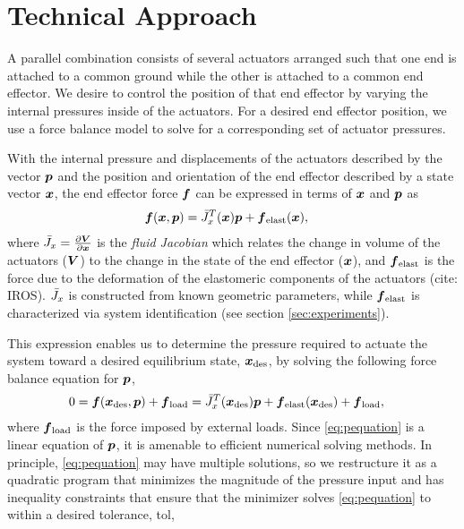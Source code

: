 \section{Technical Approach}    \label{sec:technical-approach}

A parallel combination consists of several actuators arranged such that one end is attached to a common ground while the other is attached to a common end effector. We desire to control the position of that end effector by varying the internal pressures inside of the actuators. For a desired end effector position, we use a force balance model to solve for a corresponding set of actuator pressures.

With the internal pressure and displacements of the actuators described by the vector $\p$ and the position and orientation of the end effector described by a state vector $\x$, the end effector force $\f$ can be expressed in terms of $\x$ and $\p$ as 
\begin{align}
    \f (\x, \p) &= \J_x^T (\x) \p + \f_{\tx{elast}} ( \x ),
\end{align}
where $\J_x = \frac{\partial \vec{V}}{\partial \x}$ is the \emph{fluid Jacobian} which relates the change in volume of the actuators ($\V$) to the change in the state of the end effector ($\x$), and $\f_\tx{elast}$ is the force due to the deformation of the elastomeric components of the actuators (cite: IROS). $\bar{J}_x$ is constructed from known geometric parameters, while $\f_\tx{elast}$ is characterized via system identification (see section \ref{sec:experiments}).

This expression enables us to determine the pressure required to actuate the system toward a desired equilibrium state, $\x_\tx{des}$, by solving the following force balance equation for $\p$,
\begin{align}
    0 &= \f (\x_{\tx{des}}, \p) + \f_\tx{load} =  \J_x^T (\x_\tx{des}) \p + \f_{\tx{elast}} (\x_\tx{des}) + \f_\tx{load} , 
    \label{eq:pequation}
\end{align}
where $\f_\tx{load}$ is the force imposed by external loads.
Since \eqref{eq:pequation} is a linear equation of $\p$, it is amenable to efficient numerical solving methods. In principle, \eqref{eq:pequation} may have multiple solutions, so we restructure it as a quadratic program that minimizes the magnitude of the pressure input and has inequality constraints that ensure that the minimizer solves \eqref{eq:pequation} to within a desired tolerance, tol,

